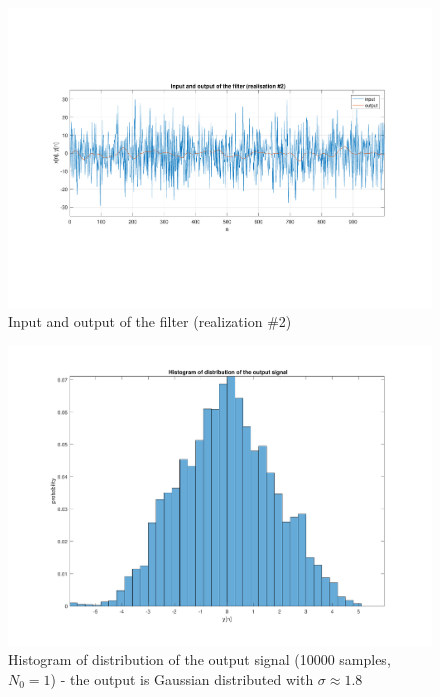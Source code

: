 \begin{figure} [H]
	\centering
	\includegraphics[trim={2.5cm 5cm 2.5cm 5cm}, clip, width=\linewidth]{io_2}
	\caption{Input and output of the filter (realization \#2)}
	\label{fig:t3_io_2}
\end{figure}
\begin{figure}[H]
	\centering
	\includegraphics[trim={2.5cm 1.5cm 2.5cm 1.5cm}, clip, width=0.75\linewidth]{histogram}
	\caption{Histogram of distribution of the output signal  (10000 samples, $N_0=1$) - the output is Gaussian distributed with $\sigma\approx 1.8$}
	\label{fig:t3_histogram}
\end{figure}

